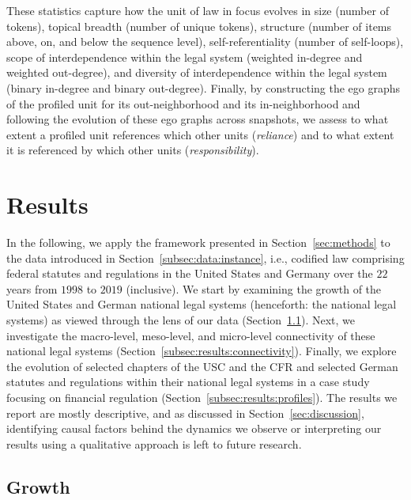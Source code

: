 \documentclass[utf8,sort&compress,table,hidelinks]{frontiersFPHY} %
\begin{document}
These statistics capture how the unit of law in focus evolves in size (number of tokens), 
topical breadth (number of unique tokens), 
structure (number of items above, on, and below the sequence level), 
self-referentiality (number of self-loops), 
scope of interdependence within the legal system (weighted in-degree and weighted out-degree), 
and diversity of interdependence within the legal system (binary in-degree and binary out-degree).
Finally, by constructing the ego graphs of the profiled unit for its out-neighborhood and its in-neighborhood and following the evolution of these ego graphs across snapshots,
we assess to what extent a profiled unit references which other units (\emph{reliance}) 
and to what extent it is referenced by which other units (\emph{responsibility}).


\section{Results}
\label{sec:results}

In the following, we apply the framework presented in Section~\ref{sec:methods} to the data introduced in Section~\ref{subsec:data:instance}, i.e., codified law comprising federal statutes and regulations in the United States and Germany over the $22$ years from $1998$ to $2019$ (inclusive).
We start by examining the growth of the United States and German national legal systems (henceforth: the national legal systems) as viewed through the lens of our data (Section~\ref{subsec:results:growth}).
Next, we investigate the macro-level, meso-level, and micro-level connectivity of these national legal systems (Section~\ref{subsec:results:connectivity}).
Finally, we explore the evolution of selected chapters of the USC and the CFR and selected German statutes and regulations within their national legal systems in a case study focusing on financial regulation (Section~\ref{subsec:results:profiles}).
The results we report are mostly descriptive, and as discussed in Section~\ref{sec:discussion}, identifying causal factors behind the dynamics we observe or interpreting our results using a qualitative approach is left to future research.

\vspace*{30pt}
\subsection{Growth}
\label{subsec:results:growth}
\end{document}
